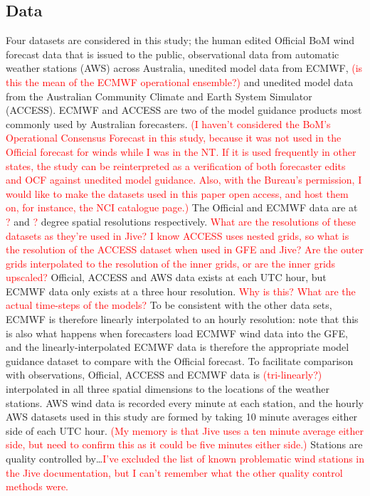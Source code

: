 \documentclass{ametsoc}
\begin{document}
\subsection{Data} 
Four datasets are considered in this study; the human edited Official BoM wind forecast data that is issued to the public, observational data from automatic weather stations (AWS) across Australia, unedited model data from ECMWF, \textcolor{red}{(is this the mean of the ECMWF operational ensemble?)} and unedited model data from the Australian Community Climate and Earth System Simulator (ACCESS). ECMWF and ACCESS are two of the model guidance products most commonly used by Australian forecasters. \textcolor{red}{(I haven't considered the BoM's Operational Consensus Forecast in this study, because it was not used in the Official forecast for winds while I was in the NT. If it is used frequently in other states, the study can be reinterpreted as a verification of both forecaster edits and OCF against unedited model guidance. Also, with the Bureau's permission, I would like to make the datasets used in this paper open access, and host them on, for instance, the NCI catalogue page.)} The Official and ECMWF data are at \textcolor{red}{?} and \textcolor{red}{?} degree spatial resolutions respectively. \textcolor{red}{What are the resolutions of these datasets as they're used in Jive? I know ACCESS uses nested grids, so what is the resolution of the ACCESS dataset when used in GFE and Jive? Are the outer grids interpolated to the resolution of the inner grids, or are the inner grids upscaled?} Official, ACCESS and AWS data exists at each UTC hour, but ECMWF data only exists at a three hour resolution. \textcolor{red}{Why is this? What are the actual time-steps of the models?} To be consistent with the other data sets, ECMWF is therefore linearly interpolated to an hourly resolution: note that this is also what happens when forecasters load ECMWF wind data into the GFE, and the linearly-interpolated ECMWF data is therefore the appropriate model guidance dataset to compare with the Official forecast. To facilitate comparison with observations, Official, ACCESS and ECMWF data is \textcolor{red}{(tri-linearly?)} interpolated in all three spatial dimensions to the locations of the weather stations. AWS wind data is recorded every minute at each station, and the hourly AWS datasets used in this study are formed by taking 10 minute averages either side of each UTC hour. \textcolor{red}{(My memory is that Jive uses a ten minute average either side, but need to confirm this as it could be five minutes either side.)} Stations are quality controlled by\ldots \textcolor{red}{I've excluded the list of known problematic wind stations in the Jive documentation, but I can't remember what the other quality control methods were.}
\end{document}
